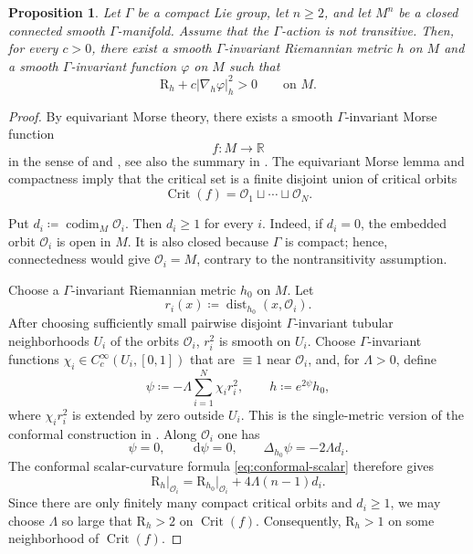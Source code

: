 \documentclass[11pt]{amsart}
\numberwithin{equation}{section}
\newtheorem{proposition}[theorem]{Proposition}
\newcommand{\dist}{\operatorname{dist}}
\newcommand{\dd}{\,\mathrm d}
\newcommand{\scal}{\mathrm{R}}
\DeclareMathOperator{\Crit}{Crit}
\DeclareMathOperator{\codim}{codim}
\let\geq\geqslant
\begin{document}
\begin{proposition}\label{thm:mainnew2}
Let $\Gamma$ be a compact Lie group, let $n\geq 2$, and let $M^n$ be a
closed connected smooth $\Gamma$-manifold. Assume that the $\Gamma$-action
is not transitive. Then, for every $c>0$, there exist a smooth
$\Gamma$-invariant Riemannian metric $h$ on $M$ and a smooth
$\Gamma$-invariant function $\varphi$ on $M$ such that
\begin{equation}\label{eq:strict-main2}
    \scal_h+c|\nabla_h\varphi|_h^2>0
    \qquad\text{on }M.
\end{equation}
\end{proposition}

\begin{proof}
By equivariant Morse theory, there exists a smooth $\Gamma$-invariant
Morse function 
\[
    f:M\longrightarrow\mathbb R
\]
in the sense of \cite{WassermanEquivariantDifferentialTopology} and \cite{MayerInvariantMorseFunctions}, see also the summary in
\cite[Section 2, pp.~3--4]{BaerHankeLocalFlexibility}.
The equivariant Morse lemma
\cite[Satz~1.3]{MayerInvariantMorseFunctions} and compactness imply that
the critical set is a finite disjoint union of critical orbits
\[
    \Crit(f)=\mathcal O_1\sqcup\cdots\sqcup\mathcal O_N.
\]

Put $
    d_i\coloneqq \codim_M\mathcal O_i$. 
Then $d_i\geq 1$ for every $i$. Indeed, if $d_i=0$, the embedded orbit
$\mathcal O_i$ is open in $M$. It is also closed because $\Gamma$ is
compact; hence, connectedness would give $\mathcal O_i=M$, contrary to
the nontransitivity assumption.
\smallskip

Choose a $\Gamma$-invariant Riemannian metric $h_0$ on $M$. Let
\[
    r_i(x)\coloneqq \dist_{h_0}(x,\mathcal O_i).
\]
After
choosing sufficiently small pairwise disjoint $\Gamma$-invariant tubular neighborhoods
$U_i$ of the orbits $\mathcal{O}_i$, $r_i^2$ is smooth on $U_i$. Choose
$\Gamma$-invariant functions $\chi_i\in C^\infty_c(U_i,[0,1])$ that
are $\equiv 1$ near $\mathcal O_i$, and, for $\Lambda>0$, define
\[
    \psi\coloneqq -\Lambda\sum_{i=1}^N\chi_i r_i^2,
    \qquad
    h\coloneqq e^{2\psi}h_0,
\]
where $\chi_i r_i^2$ is extended by zero outside $U_i$. This is the
single-metric version of the conformal construction in
\cite[proof of Lemma~2.5, (2.6)]
{BaerHankeLocalFlexibility}. Along $\mathcal O_i$ one has
\[
    \psi=0,\qquad
    \dd\psi=0,\qquad
    \Delta_{h_0}\psi=-2\Lambda d_i.
\]
The conformal scalar-curvature formula \eqref{eq:conformal-scalar} therefore gives
\begin{equation}\label{eq:scalar-critical-orbit}
    \scal_h\big|_{\mathcal O_i}
    =
    \scal_{h_0}\big|_{\mathcal O_i}
    +4\Lambda(n-1)d_i.
\end{equation}
Since there are only finitely many compact critical orbits and $d_i\geq1$,
we may choose $\Lambda$ so large that $\scal_h>2$ on $\Crit(f)$.
Consequently, $\scal_h>1$ on some neighborhood of $\Crit(f)$.


\end{proof}
\end{document}
